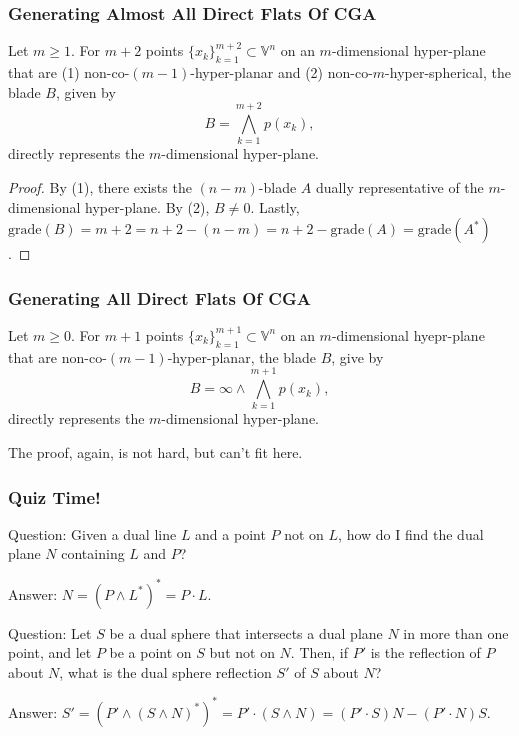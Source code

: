 \documentclass{beamer}
\newcommand{\V}{\mathbb{V}}
\newcommand{\nvai}{\infty}
\newcommand{\grade}{\mbox{grade}}
\begin{document}
\begin{frame}
\frametitle{Generating \alert{Almost} All \alert{Direct Flats} Of CGA}
Let $m\geq 1$.
For $m+2$ points $\{x_k\}_{k=1}^{m+2}\subset\V^n$ on an $m$-dimensional hyper-plane that
are \alert{(1)} non-co-$(m-1)$-hyper-planar and \alert{(2)} non-co-$m$-hyper-spherical, the blade $B$,
given by
\begin{equation*}
B = \bigwedge_{k=1}^{m+2} p(x_k),
\end{equation*}
\alert{directly} represents the $m$-dimensional hyper-plane.\pause
\begin{proof}
By \alert{(1)}, there exists the $(n-m)$-blade $A$ \alert{dually} representative of the
$m$-dimensional hyper-plane.  By \alert{(2)}, $B\neq 0$.  Lastly,
$\grade(B)=m+2=n+2-(n-m)=n+2-\grade(A)=\grade(A^*)$.
\end{proof}
\end{frame}

\begin{frame}
\frametitle{Generating All \alert{Direct Flats} Of CGA}
Let $m\geq 0$.  For $m+1$ points $\{x_k\}_{k=1}^{m+1}\subset\V^n$ on an $m$-dimensional
hyepr-plane that are non-co-$(m-1)$-hyper-planar, the blade $B$, give by
\begin{equation*}
B = \nvai\wedge\bigwedge_{k=1}^{m+1} p(x_k),
\end{equation*}
\alert{directly} represents the $m$-dimensional hyper-plane.\pause

The proof, again, is not hard, but can't fit here.
\end{frame}

\begin{frame}
\frametitle{Quiz Time!}
\alert{Question}: Given a \alert{dual} line $L$ and a point $P$ not on $L$,
how do I find the \alert{dual} plane $N$ containing $L$ and $P$?\pause

\alert{Answer}: $N = (P\wedge L^*)^* = P\cdot L$.\pause

%

\alert{Question}: Let $S$ be a \alert{dual} sphere that intersects a \alert{dual} plane $N$ in more than one point, and let $P$ be a point on $S$ but not on $N$.  Then, if $P'$ is the reflection of $P$ about $N$, what is the \alert{dual} sphere reflection $S'$ of $S$ about $N$?\pause

\alert{Answer}: $S' = (P'\wedge(S\wedge N)^*)^* = P'\cdot(S\wedge N) = (P'\cdot S)N - (P'\cdot N)S$.
\end{frame}
\end{document}
